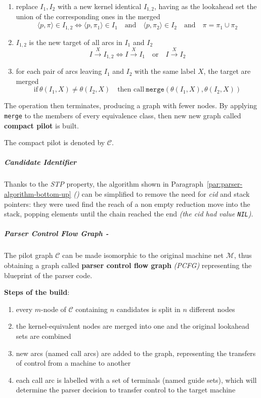 \documentclass[english]{article}
\begin{document}
\begin{enumerate}
  \item replace \mstates \(I_1, I_2\) with a new kernel identical \mstate \(I_{1,2}\), having as the lookahead set the union of the corresponding ones in the merged \mstates
        \[ \langle p, \pi \rangle \in I_{1, 2} \iff \langle p, \pi_1 \rangle \in I_1 \quad \text{and} \quad \langle p, \pi_2 \rangle \in I_2 \quad \text{and} \quad \pi = \pi_1 \cup \pi_2 \]
  \item \mstate \(I_{1,2}\) is the new target of all arcs in \(I_1\) and \(I_2\)
        \[ I \xrightarrow{X} I_{1,2} \iff I \xrightarrow{X} I_1 \quad \text{or} \quad I \xrightarrow{X} I_2 \]
  \item for each pair of arcs leaving \(I_1\) and \(I_2\) with the same label \(X\), the target \mstates are merged
        \[ \text{if} \ \theta(I_1, X) \neq \theta(I_2, X) \quad \text{then call} \ \texttt{merge}(\theta(I_1, X), \theta(I_2, X)) \]
\end{enumerate}

The operation then terminates, producing a graph with fewer nodes.
By applying \texttt{merge} to the members of every equivalence class, then new new graph called \textbf{compact pilot} is built.

The compact pilot is denoted by \(\mathcal{C}\).

\subparagraph*{Candidate Identifier}

Thanks to the \textit{STP} property, the algorithm shown in Paragraph~\ref{par:parser-algorithm-bottom-up} \textit{()} can be simplified to remove the need for \textit{cid} and stack pointers:
they were used find the reach of a non empty reduction move into the stack, popping elements until the chain reached the end \textit{(the \textit{cid} had value \texttt{NIL})}.

\subparagraph*{Parser Control Flow Graph - \PCFG}

The pilot graph \(\mathcal{C}\) can be made isomorphic to the original machine net \(\mathcal{M}\), thus obtaining a graph called \textbf{parser control flow graph} \textit{(PCFG)} representing the blueprint of the parser code.

\bigskip
\textbf{Steps of the build}:

\begin{enumerate}
  \item every \(m\)-node of \(\mathcal{C}\) containing \(n\) candidates is split in \(n\) different nodes
  \item the kernel-equivalent nodes are merged into one and the original lookahead sets are combined
  \item new arcs (named call arcs) are added to the graph, representing the transfers of control from a machine to another
  \item each call arc is labelled with a set of terminals (named guide sets), which will determine the parser decision to transfer control to the target machine
\end{enumerate}
\end{document}
